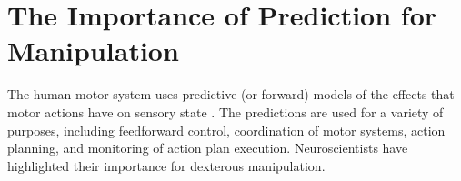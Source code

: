 
\section{The Importance of Prediction for Manipulation}
\label{sec:motivation}
The human motor system uses predictive (or forward) models of the effects that motor actions have on sensory state \citep{flanagan03,flanagan06,mehta02,witney00,johansson92}. The predictions are used for a variety of purposes, including feedforward control, coordination of motor systems, action planning, and monitoring of action plan execution. Neuroscientists have highlighted their importance for dexterous manipulation.



